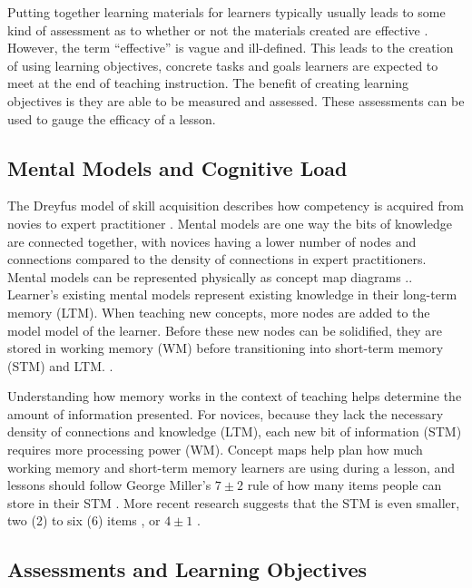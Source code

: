 \documentclass[040-assessment.tex]{subfiles}
\begin{document}
Putting together learning materials for learners typically usually leads to some kind of
assessment as to whether or not the materials created are effective
\cite{ambrose2010learning, wilson2019teaching}.
However, the term ``effective'' is vague and ill-defined.
This leads to the creation of using learning objectives,
concrete tasks and goals learners are expected to meet at the end of teaching instruction.
The benefit of creating learning objectives is they are able to be measured and assessed.
These assessments can be used to gauge the efficacy of a lesson.

\subsection{Mental Models and Cognitive Load}

The Dreyfus model of skill acquisition describes how competency is acquired from
novies to expert practitioner
\cite{dreyfus1980five, bennerUsingDreyfusModel2004}.
Mental models are one way the bits of knowledge are connected together,
with novices having a lower number of nodes and connections compared to the
density of connections in expert practitioners.
Mental models can be represented physically as concept map diagrams
\cite{Koch2016, wilson2019teaching}..
Learner's existing mental models represent existing knowledge in their long-term memory (LTM).
When teaching new concepts,
more nodes are added to the model model of the learner.
Before these new nodes can be solidified, they are stored in working memory (WM)
before transitioning into short-term memory (STM) and LTM.
\cite{Koch2016, hermansProgrammerBrain2021, wilson2019teaching}.

Understanding how memory works in the context of teaching
helps determine the amount of information presented.
For novices, because they lack the necessary density of connections and knowledge (LTM),
each new bit of information (STM) requires more processing power (WM).
Concept maps help plan how much working memory and short-term memory learners are using during a lesson,
and lessons should follow George Miller's $7\pm2$ rule of how many items people can store in their STM
\cite{miller1956magical}.
More recent research suggests that the STM is even smaller, two (2) to six (6) items
\cite{hermansProgrammerBrain2021},
or $4\pm1$ \cite{didauWhatEveryTeacher2016}.

\subsection{Assessments and Learning Objectives}
\end{document}
